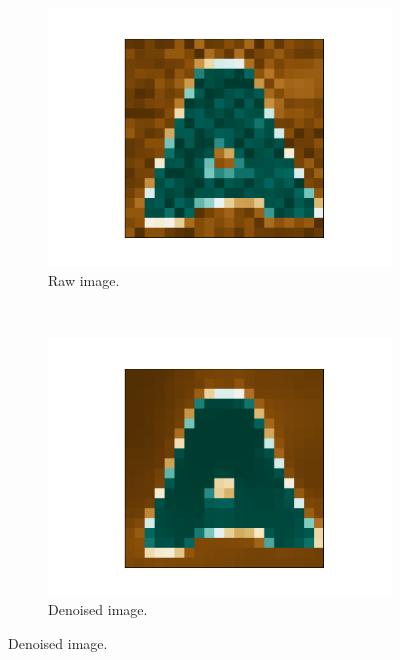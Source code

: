 \documentclass[../main.tex]{subfiles}
\begin{document}
\begin{figure}
    \centering
    \begin{subfigure}[b]{0.48\textwidth}
        \includegraphics[width=\textwidth]{figures/pp/raw.pdf}
        \caption{Raw image.}
        \label{fig:gull}
    \end{subfigure}
    ~ %
    \begin{subfigure}[b]{0.48\textwidth}
        \includegraphics[width=\textwidth]{figures/pp/denoise.pdf}
        \caption{Denoised image.}
        \label{fig:denoise}
    \end{subfigure}

\end{figure}
\end{document}
